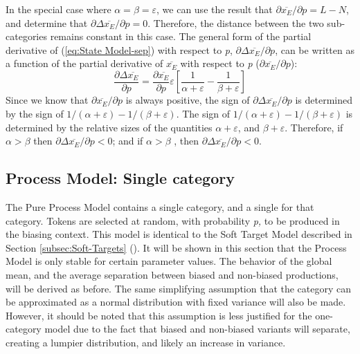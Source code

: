In the special case where $\alpha=\beta=\varepsilon$, we can use
the result that ${\partial\overline{x_{E}}}/{\partial p}=L-N$,
and determine that ${\partial\Delta\overline{x_{E}}}/{\partial p}=0$.
Therefore, the distance between the two sub-categories remains constant
in this case. The general form of the partial derivative of (\ref{eq:State Model-sep})
with respect to \emph{p}, ${\partial\Delta\overline{x_{E}}}/{\partial p}$,
can be written as a function of the partial derivative of $\overline{x_{E}}$
with respect to \emph{p} (${\partial\overline{x_{E}}}/{\partial p}$):
\begin{equation}
\frac{\partial\Delta\overline{x_{E}}}{\partial p}=\frac{\partial\overline{x_{E}}}{\partial p}\varepsilon\left[\frac{1}{\alpha+\varepsilon}-\frac{1}{\beta+\varepsilon}\right]\label{eq: Model G: dsep/dp}
\end{equation}
Since we know that ${\partial\overline{x_{E}}}/{\partial p}$
is always positive, the sign of ${\partial\Delta\overline{x_{E}}}/{\partial p}$
is determined by the sign of ${1}/({\alpha+\varepsilon})-{1}/({\beta+\varepsilon})$.
The sign of ${1}/({\alpha+\varepsilon})-{1}/({\beta+\varepsilon})$
is determined by the relative sizes of the quantities $\alpha+\varepsilon$,
and $\beta+\varepsilon$. Therefore, if $\alpha>\beta$ then ${\partial\Delta\overline{x_{E}}}/{\partial p}<0$;
and if $\alpha>\beta$ , then ${\partial\Delta\overline{x_{E}}}/{\partial p}<0$.

\subsection{\label{subsec:Model-B:-Lengthening}Process Model: Single category}

The Pure Process Model contains a single category, and a single 
for that category. Tokens are selected at random, with probability
\emph{p,} to be produced in the biasing context. This model is identical
to the Soft Target Model described in Section \ref{subsec:Soft-Targets}
(). It will be shown in this
section that the Process Model is only stable for certain parameter
values. The behavior of the global mean, and the average separation
between biased and non-biased productions, will be derived as before.
The same simplifying assumption that the category can be approximated
as a normal distribution with fixed variance will also be made. However,
it should be noted that this assumption is less justified for the
one-category model due to the fact that biased and non-biased variants
will separate, creating a lumpier distribution, and likely an increase
in variance.

